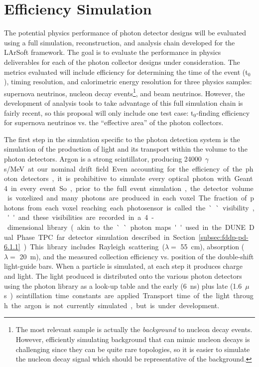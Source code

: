 \section{Efficiency Simulation}
\label{sec:fdsp-pd-simphys}

The potential physics performance of photon detector designs will be evaluated using a full simulation, reconstruction, and analysis chain developed for the LArSoft framework. The goal is to evaluate the performance in physics deliverables for each of the photon collector designs under consideration. The metrics evaluated will include efficiency for determining the time of the event (t$_0$), timing resolution, and calorimetric energy resolution for three physics samples: supernova neutrinos, nucleon decay events\footnote{The most relevant sample is actually the \emph{background} to nucleon decay events. However, efficiently simulating background that can mimic nucleon decays is challenging since they can be quite rare topologies, so it is easier to simulate the nucleon decay signal which should be representative of the background.}, and beam neutrinos. However, the development of analysis tools to take advantage of this full simulation chain is fairly recent, so this proposal will only include one test case: t$_0$-finding efficiency for supernova neutrinos vs. the ``effective area'' of the photon collectors.

The first step in the simulation specific to the photon detection system is the simulation of the production of light and its transport within the volume to the photon detectors. Argon is a strong scintillator, producing \SI{24000}{$\gamma$s/MeV} at our nominal drift field. Even accounting for the efficiency of the photon detectors, it is prohibitive to simulate every optical photon with Geant4 in every event. So, prior to the full event simulation, the detector volume is voxelized and many photons are produced in each voxel. The fraction of photons from each voxel reaching each photosensor is called the ``visibility,'' and these visibilities are recorded in a 4-dimensional library (akin to the ``photon maps'' used in the DUNE Dual Phase TPC far detector simulation described in Section~\ref{subsec:fddp-pd-6.1.1}). This library includes Rayleigh scattering ($\lambda=$ \SI{55}{cm}), absorption ($\lambda=$ \SI{20}{m}), and the measured collection efficiency vs. position of the double-shift light-guide bars. When a particle is simulated, at each step it produces charge and light. The light produced is distributed onto the various photon detectors using the photon library as a look-up table and the early (\SI{6}{ns}) plus late (\SI{1.6}{$\mu$s}) scintillation time constants are applied. Transport time of the light through the argon is not currently simulated, but is under development.


